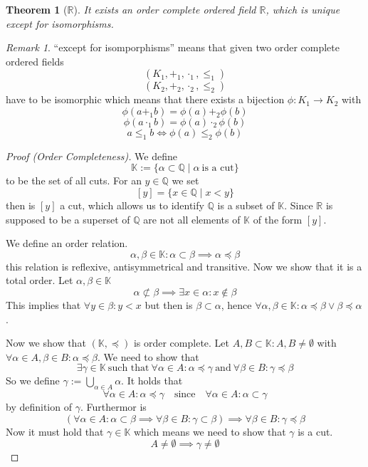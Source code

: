\documentclass[english,titlepage]{uzhpub}
\theoremstyle{definition}
\theoremstyle{plain}
\newtheorem{theorem}[definition]{Theorem} %
\theoremstyle{remark}
\newtheorem*{remark}{Remark}
\theoremstyle{example}
\begin{document}
   \begin{theorem}[\(\mathbb{R}\)]
      It exists an order complete ordered field \(\mathbb{R}\), which is unique except for isomorphisms.
   \end{theorem}
   \begin{remark}
      ``except for isomporphisms'' means that given two order complete ordered fields
      \[(K_1, +_1, \cdot_1, \leq_1)\]
      \[(K_2, +_2, \cdot_2, \leq_2)\]
      have to be isomorphic which means that there exists a bijection \(\phi: K_1 \to K_2\) with
      \[\phi(a +_1 b) = \phi(a) +_2 \phi(b)\]
      \[\phi(a \cdot_1 b) = \phi(a) \cdot_2 \phi(b)\]
      \[a \leq_1 b \iff \phi(a) \leq_2 \phi(b)\]
   \end{remark}
   \begin{proof}[Proof (Order Completeness)]
      We define
      \[\mathbb{K} := \{\alpha \subset \mathbb{Q} \mid \alpha~\text{is a cut}\}\]
      to be the set of all cuts.
      For an \(y \in \mathbb{Q}\) we set
      \[[y] = \{x \in \mathbb{Q} \mid x < y\}\]
      then is \([y]\) a cut, which allows us to identify \(\mathbb{Q}\) is a subset of \(\mathbb{K}\).
      Since \(\mathbb{R}\) is supposed to be a superset of \(\mathbb{Q}\) are not all elements of \(\mathbb{K}\) of the form \([y]\).

      We define an order relation.
      \[\alpha, \beta \in \mathbb{K}: \alpha \subset \beta \implies \alpha \preceq \beta\]
      this relation is reflexive, antisymmetrical and transitive.
      Now we show that it is a total order.
      Let \(\alpha, \beta \in \mathbb{K}\)
      \[\alpha \not\subset \beta \implies \exists x \in \alpha: x \not\in \beta\]
      This implies that \(\forall y \in \beta: y < x\) but then is \(\beta \subset \alpha\), hence \(\forall \alpha, \beta \in \mathbb{K}: \alpha \preceq \beta \lor \beta \preceq \alpha\).

      Now we show that \((\mathbb{K}, \preceq)\) is order complete.
      Let \(A, B \subset \mathbb{K}: A, B \neq \emptyset\) with \(\forall \alpha \in A, \beta \in B: \alpha \preceq \beta\).
      We need to show that
      \[\exists \gamma \in \mathbb{K}~\text{such that}~\forall \alpha \in A: \alpha \preceq \gamma~\text{and}~\forall \beta \in B: \gamma \preceq \beta\]
      So we define \(\gamma := \bigcup_{\alpha \in A} \alpha\).
      It holds that
      \[\forall \alpha \in A: \alpha \preceq \gamma \quad\text{since}\quad \forall \alpha \in A: \alpha \subset \gamma\]
      by definition of \(\gamma\).
      Furthermor is
      \[(\forall \alpha \in A: \alpha \subset \beta \implies \forall \beta \in B: \gamma \subset \beta) \implies \forall \beta \in B: \gamma \preceq \beta\]
      Now it must hold that \(\gamma \in \mathbb{K}\) which means we need to show that \(\gamma\) is a cut.
      \[A \neq \emptyset \implies \gamma \neq \emptyset\]


\end{proof}
\end{document}
